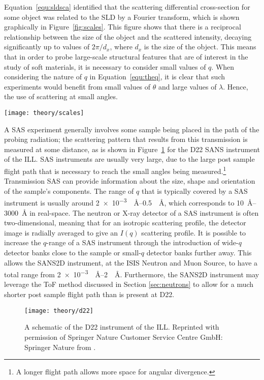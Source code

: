 Equation~\ref{equ:sldsca} identified that the scattering differential cross-section for some object was related to the SLD by a Fourier transform, which is shown graphically in Figure~\ref{fig:scales}.
This figure shows that there is a reciprocal relationship between the size of the object and the scattered intensity, decaying significantly up to values of $2\pi/d_x$, where $d_x$ is the size of the object.
This means that in order to probe large-scale structural features that are of interest in the study of soft materials, it is necessary to consider small values of $q$.
When considering the nature of $q$ in Equation~\ref{equ:theq}, it is clear that such experiments would benefit from small values of $\theta$ and large values of $\lambda$.
Hence, the use of scattering at small angles.
%
\begin{marginfigure}
    \centering
    \texttt{[image: theory/scales]}
    \caption{The effect of a Fourier transform (a) the scattering length density profile for some object with a width of \SI{10}{\angstrom}, (b) the Fourier transform of this object showing the minima in the differential cross section at values of $\sfrac{2n\pi}{10}$, where $n$ is some integer.}
    \label{fig:scales}
\end{marginfigure}
%

A SAS experiment generally involves some sample being placed in the path of the probing radiation; the scattering pattern that results from this transmission is measured at some distance, as is shown in Figure~\ref{fig:sasgeo} for the D22 SANS instrument of the ILL.
SAS instruments are usually very large, due to the large post sample flight path that is necessary to reach the small angles being measured.\footnote{A longer flight path allows more space for angular divergence.}
Transmission SAS can provide information about the size, shape and orientation of the sample's components.\autocite{willis_experimental_2009}
The range of $q$ that is typically covered by a SAS instrument is usually around \SIrange{2e-3}{0.5}{\per\angstrom}, which corresponds to \SIrange{10}{3000}{\angstrom} in real-space.
The neutron or X-ray detector of a SAS instrument is often two-dimensional, meaning that for an isotropic scattering profile, the detector image is radially averaged to give an $I(q)$ scattering profile.
It is possible to increase the $q$-range of a SAS instrument through the introduction of wide-$q$ detector banks close to the sample or small-$q$ detector banks further away.
This allows the SANS2D instrument, at the ISIS Neutron and Muon Source, to have a total range from \SIrange{2e-3}{2}{\per\angstrom}.\autocite{noauthor_isis_nodate}
Furthermore, the SANS2D instrument may leverage the ToF method discussed in Section \ref{sec:neutrons} to allow for a much shorter post sample flight path than is present at D22.
%
\begin{figure}
    \centering
    \texttt{[image: theory/d22]}
    \caption{A schematic of the D22 instrument of the ILL. Reprinted with permission of Springer Nature Customer Service Centre GmbH: Springer Nature from \cite{grillo_small-angle_2008}.}
    \label{fig:sasgeo}
\end{figure}
%

